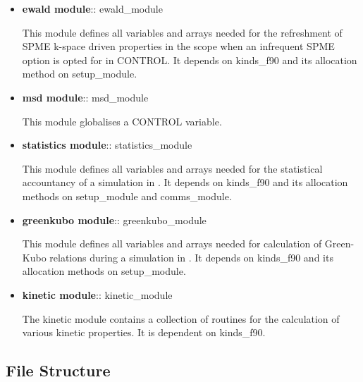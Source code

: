 \begin{itemize}
\item {\bf ewald module}:: {\sc ewald\_module}

This module defines all variables and arrays needed for the
refreshment of SPME k-space driven properties in the \D scope
when an infrequent SPME option is opted for in CONTROL.  It
depends on {\sc kinds\_f90} and its allocation method on
{\sc setup\_module}.

\item {\bf msd module}:: {\sc msd\_module}

This module globalises a CONTROL variable.

\item {\bf statistics module}:: {\sc statistics\_module}

This module defines all variables and arrays needed for the
statistical accountancy of a simulation in \D.  It depends on
{\sc kinds\_f90} and its allocation methods on {\sc setup\_module}
and {\sc comms\_module}.

\item {\bf greenkubo module}:: {\sc greenkubo\_module}

This module defines all variables and arrays needed for calculation
of Green-Kubo relations during a simulation in \D.  It depends on
{\sc kinds\_f90} and its allocation methods on {\sc setup\_module}.

\item {\bf kinetic module}:: {\sc kinetic\_module}

The kinetic module contains a collection of routines for the
calculation of various kinetic properties.
It is dependent on {\sc kinds\_f90}.

\end{itemize}

\subsection{File Structure}
\label{file-structure}

